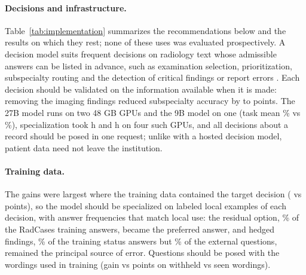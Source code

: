\paragraph{Decisions and infrastructure.} Table~\ref{tab:implementation} summarizes the recommendations below and the results on which they rest; none of these uses was evaluated prospectively. A decision model suits frequent decisions on radiology text whose admissible answers can be listed in advance, such as examination selection, prioritization, subspecialty routing and the detection of critical findings or report errors \citep{paschali2025foundation,bluethgen2025bestpractices}. Each decision should be validated on the information available when it is made: removing the imaging findings reduced subspecialty accuracy by  to  points. The 27B model runs on two 48 GB GPUs and the 9B model on one (task mean \% vs \%), specialization took  h and  h on four such GPUs, and all decisions about a record should be posed in one request; unlike with a hosted decision model, patient data need not leave the institution. %

\paragraph{Training data.} The gains were largest where the training data contained the target decision ( vs  points), so the model should be specialized on labeled local examples of each decision, with answer frequencies that match local use: the residual option, \% of the RadCases training answers, became the preferred answer, and hedged findings, \% of the training status answers but \% of the external questions, remained the principal source of error. Questions should be posed with the wordings used in training (gain  vs  points on withheld vs seen wordings). %

